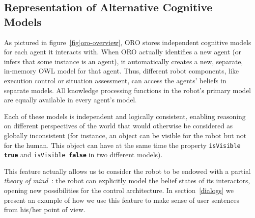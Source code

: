 \documentclass{svmult}
\newcommand{\concept}[1]{{\footnotesize \texttt{#1}}}
\newcommand{\eg}{{\textit{e.g.~}}}
\begin{document}
\subsection{Representation of Alternative Cognitive Models}
\label{alterite}

As pictured in figure~\ref{fig|oro-overview}, ORO stores independent cognitive
models for each agent it interacts with. When ORO actually identifies a new
agent (or infers that some instance is an agent), it automatically creates a
new, separate, in-memory OWL model for that agent. Thus, different robot
components, like execution control or situation assessment, can access the
agents' beliefs in separate models. All knowledge processing functions in the
robot's primary model are equally available in every agent's model.

Each of these models is independent and logically consistent,
enabling reasoning on different perspectives of the world that would otherwise
be considered as globally inconsistent (for instance, an object can be visible for the
robot but not for the human. This object can have at the same time the property
\concept{isVisible \textbf{true}} and \concept{isVisible \textbf{false}} in
two different models). 

This feature actually allows us to consider the robot to be endowed with a partial
\emph{theory of mind}~\cite{Leslie2000}: the robot can explicitly model
the belief states of its interactors, opening new possibilities for the control
architecture. In section~\ref{dialogs} we present an example of how we use this feature to
make sense of user sentences from his/her point of view.

% 
% 
\end{document}
